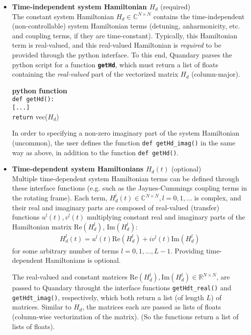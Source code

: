 \documentclass[11pt]{article}
\newcommand{\R}{\mathds{R}}
\newcommand{\C}{\mathds{C}}
\begin{document}
\begin{itemize}
  \item \textbf{Time-independent system Hamiltonian $H_d$} (required)\\
  The constant system Hamiltonian $H_d \in \C^{N\times N}$ contains the time-independent (non-controllable) system Hamiltonian terms (detuning, anharmonicity, etc. and coupling terms, if they are time-constant). Typically, this Hamiltonian term is real-valued, and this real-valued Hamiltonian is \textit{required} to be provided through the python interface. To this end, 
  Quandary parses the python script for a function \texttt{\textbf{getHd}}, which must return a list of floats containing the \textit{real-valued} part of the vectorized matrix $H_d$ (column-major). 

  \textbf{python function}\\
  \texttt{def getHd():}\\
  \indent\hspace{1cm}\texttt{[...]}  \\
  \indent\hspace{1cm}\texttt{return} vec($H_d$) 

  In order to specifying a non-zero imaginary part of the system Hamiltonian (uncommon), the user defines the function \texttt{def getHd\_imag()} in the same way as above, in addition to the function \texttt{def getHd()}. 

  \item \textbf{Time-dependent system Hamiltonians $H_d(t)$} (optional) \\
  Multiple time-dependent system Hamiltonian terms can be defined through these interface functions (e.g. such as the Jaynes-Cummings coupling terms in the rotating frame). Each term, $H_d^l(t) \in \C^{N\times N}, l=0,1,\dots$ is complex, and their real and imaginary parts are composed of real-valued (transfer) functions $u^l(t), v^l(t)$ multiplying constant real and imaginary parts of the Hamiltonian matrix $\mbox{Re}(H_d^l)$, $\mbox{Im}(H_d^l)$: 
  \begin{align}
   H_d^l(t) = u^l(t) \mbox{Re}\left(H_d^l\right) + i v^l(t) \mbox{Im}\left(H_d^l\right)
  \end{align}
  for some arbitrary number of terms $l=0,1,\dots, L-1$. Providing time-dependent Hamiltonians is optional. 
  
  The real-valued and constant matrices $\mbox{Re}(H^l_{d}), \mbox{Im}(H^l_d)\in \R^{N\times N}$, are passed to Quandary throught the interface functions \texttt{getHdt\_real()} and \texttt{getHdt\_imag()}, respectively, which both return a list (of length $L$) of matrices. Similar to $H_d$, the matrices each are passed as lists of floats (column-wise vectorization of the matrix). (So the functions return a list of lists of floats).


\end{itemize}
\end{document}
